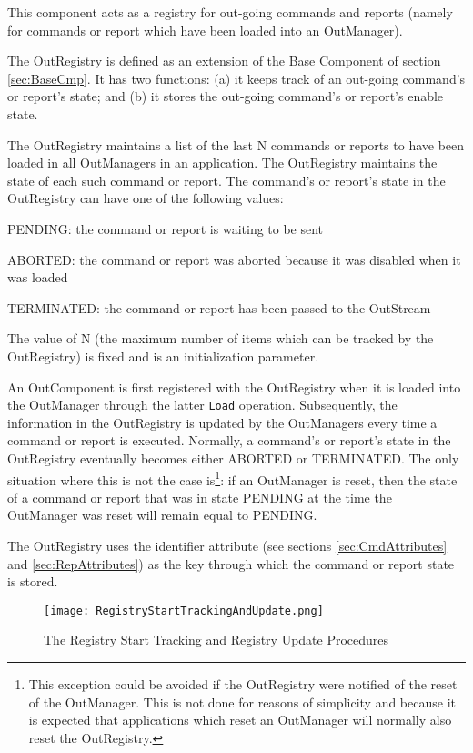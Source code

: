 This component acts as a registry for out-going commands and reports (namely for commands or report which have been loaded into an OutManager).

The OutRegistry is defined as an extension of the Base Component of section \ref{sec:BaseCmp}. It has two functions: (a) it keeps track of an out-going command's or report's state; and (b) it stores the out-going command's or report's enable state.

The OutRegistry maintains a list of the last N commands or reports to have been loaded in all OutManagers in an application. The OutRegistry maintains the state of each such command or report. The command's or report's state in the OutRegistry can have one of the following values:
\begin{fw_itemize}
\item PENDING: the command or report is waiting to be sent
\item ABORTED: the command or report was aborted because it was disabled when it was loaded
\item TERMINATED: the command or report has been passed to the OutStream
\end{fw_itemize}
The value of N (the maximum number of items which can be tracked by the OutRegistry) is fixed and is an initialization parameter.

An OutComponent is first registered with the OutRegistry when it is loaded into the OutManager through the latter \texttt{Load} operation. Subsequently, the information in the OutRegistry is updated by the OutManagers every time a command or report is executed. Normally, a command's or report's state in the OutRegistry eventually becomes either ABORTED or TERMINATED. The only situation where this is not the case is\footnote{This exception could be avoided if the OutRegistry were notified of the reset of the OutManager. This is not done for reasons of simplicity and because it is expected that applications which reset an OutManager will normally also reset the OutRegistry.}: if an OutManager is reset, then the state of a command or report that was in state PENDING at the time the OutManager was reset will remain equal to PENDING.

The OutRegistry uses the identifier attribute (see sections \ref{sec:CmdAttributes} and \ref{sec:RepAttributes}) as the key through which the command or report state is stored.

\begin{figure}[h]
 \centering
 \texttt{[image: RegistryStartTrackingAndUpdate.png]}
 \caption{The Registry Start Tracking and Registry Update Procedures}
 \label{fig:RegistryStartTrackingAndUpdate}
\end{figure}

